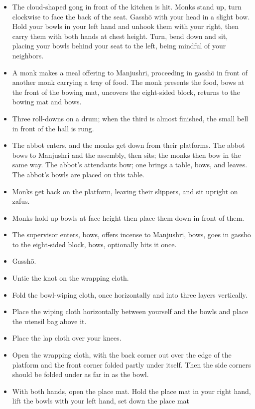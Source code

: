 \documentclass{article}
\begin{document}
\begin{multicols}{2}
\begin{itemize}
\item The cloud-shaped gong in front of the kitchen is hit. Monks stand up, turn
clockwise to face the back of the seat. Gassh\=o with your head in a slight
bow. Hold your bowls in your left hand and unhook them with your right, then
carry them with both hands at chest height. Turn, bend down and sit, placing
your bowls behind your seat to the left, being mindful of your neighbors.
\item A monk makes a meal offering to Manjushri, proceeding in gassh\=o
  in front of another monk carrying a tray of food. The monk presents the
  food, bows at the front of the bowing mat, uncovers the eight-sided block,
  returns to the bowing mat and bows.
\item Three roll-downs on a drum; when the third is almost finished, the small
  bell in front of the hall is rung.
\item The abbot enters, and the monks get down from their platforms.
  The abbot bows to Manjushri and the assembly, then sits; the monks
  then bow in the same way. The abbot's attendants bow; one brings a
  table, bows, and leaves. The abbot's bowls are placed on this table.
\item Monks get back on the platform, leaving their slippers, and sit
  upright on zafus.
\item Monks hold up bowls at face height then place them down in front of
  them.
\item The supervisor enters, bows, offers incense to Manjushri, bows,
  goes in gassh\=o to the eight-sided block, bows, optionally hits it once.
\item Gassh\=o.
\item Untie the knot on the wrapping cloth.
\item Fold the bowl-wiping cloth, once horizontally and into three layers
  vertically.
\item Place the wiping cloth horizontally between yourself and the bowls
  and place the utensil bag above it.
\item Place the lap cloth over your knees.
\item Open the wrapping cloth, with the back corner out over the edge
of the platform and the front corner folded partly under itself. Then
the side corners should be folded under as far in as the bowl.
\item With both hands, open the place mat. Hold the place mat in your
  right hand, lift the bowls with your left hand, set down the place mat

\end{itemize}
\end{multicols}
\end{document}
